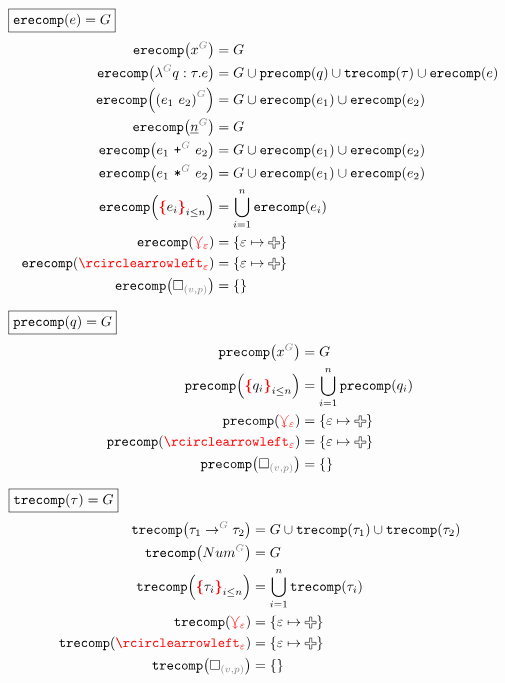 \noindent $\boxed{\operatorname{\texttt{erecomp}}\mathopen{}\left(e\right)\mathclose{} = G}$
%
\begin{align*}
  \erecomp{\eVar{G}{x}} &= G
  \\
  \erecomp{\eFun{G}{q}{\tau}{e}}
    &= G \cup \precomp{q} \cup \trecomp{\tau} \cup \erecomp{e}
  \\
  \erecomp{\eApp{G}{e_1}{e_2}}
    &= G \cup \erecomp{e_1} \cup \erecomp{e_2}
  \\
  \erecomp{\eNum{G}{n}} &= G
  \\
  \erecomp{\ePlus{G}{e_1}{e_2}}
    &= G \cup \erecomp{e_1} \cup \erecomp{e_2}
  \\
  \erecomp{\eTimes{G}{e_1}{e_2}}
    &= G \cup \erecomp{e_1} \cup \erecomp{e_2}
  \\
  \erecomp{\conflictHole{e_i}_{i \leq n}}
  &= \bigcup_{i=1}^n \erecomp{e_i}
  \\
  \erecomp{\multiVertex{\e}} &= \SetOf{\e \mapsto \Plus}
  \\
  \erecomp{\cycleVertex{\e}} &= \SetOf{\e \mapsto \Plus}
  \\
  \erecomp{\emptyHole{v}{p}} &= \SetOf{}
\end{align*}

\noindent $\boxed{\operatorname{\texttt{precomp}}\mathopen{}\left(q\right)\mathclose{} = G}$
%
\begin{align*}
  \precomp{\pVar{G}{x}} &= G
  \\
  \precomp{\conflictHole{q_i}_{i \leq n}} &= \bigcup_{i=1}^n \precomp{q_i}
  \\
  \precomp{\multiVertex{\e}} &= \SetOf{\e \mapsto \Plus}
  \\
  \precomp{\cycleVertex{\e}} &= \SetOf{\e \mapsto \Plus}
  \\
  \precomp{\emptyHole{v}{p}} &= \SetOf{}
\end{align*}

\noindent $\boxed{\operatorname{\texttt{trecomp}}\mathopen{}\left(\tau\right)\mathclose{} = G}$
%
\begin{align*}
  \trecomp{\tArrow{G}{\tau_1}{\tau_2}}
    &= G \cup \trecomp{\tau_1} \cup \trecomp{\tau_2}
  \\
  \trecomp{\tNum{G}} &= G
  \\
  \trecomp{\conflictHole{\tau_i}_{i \leq n}} &= \bigcup_{i=1}^n \trecomp{\tau_i}
  \\
  \trecomp{\multiVertex{\e}} &= \SetOf{\e \mapsto \Plus}
  \\
  \trecomp{\cycleVertex{\e}} &= \SetOf{\e \mapsto \Plus}
  \\
  \trecomp{\emptyHole{v}{p}} &= \SetOf{}
\end{align*}


